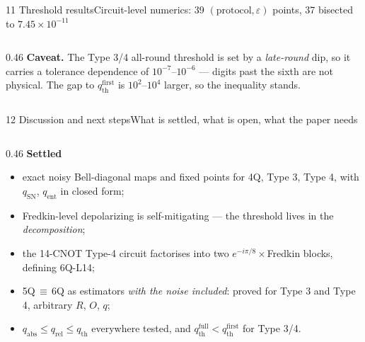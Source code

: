 \documentclass[aspectratio=169,10pt,t]{beamer}
\newcommand{\acc}[1]{{\color{qitaccent}#1}}
\begin{document}
\begin{frame}{11 \quad Threshold results}{Circuit-level numerics: 39 $(\text{protocol},\varepsilon)$ points, 37 bisected to $7.45\times10^{-11}$}
\begin{columns}[T,onlytextwidth]
\begin{column}{0.46\textwidth}
    {\color{qitink2}\textbf{Caveat.} The Type 3/4 all-round threshold is set
    by a \emph{late-round} dip, so it carries a tolerance dependence of
    $10^{-7}$--$10^{-6}$ --- digits past the sixth are not physical. The gap
    to $q_{\mathrm{th}}^{\mathrm{first}}$ is $10^{2}$--$10^{4}$ larger, so
    the inequality stands.}
  \end{column}
  \end{columns}
\end{frame}

\begin{frame}{12 \quad Discussion and next steps}{What is settled, what is open, what the paper needs}
  \vspace{0.8ex}
  \scriptsize
  \begin{columns}[T,onlytextwidth]
  \begin{column}{0.46\textwidth}\vspace{0pt}
    \textbf{Settled}
    \begin{itemize}\itemsep0.25ex
      \item exact noisy Bell-diagonal maps and fixed points for 4Q,
            Type 3, Type 4, with \acc{$q_{\mathrm{SN}}$,
            $q_{\mathrm{ent}}$} in closed form;
      \item Fredkin-level depolarizing is self-mitigating --- the threshold
            lives in the \emph{decomposition};
      \item the 14-CNOT Type-4 circuit factorises into two
            $e^{-i\pi/8}\!\times\!$Fredkin blocks, defining 6Q-L14;
      \item 5Q\,$\equiv$\,6Q as estimators \emph{with the noise included}:
            proved for Type 3 and Type 4, arbitrary $R$, $O$, $q$;
      \item $q_{\mathrm{abs}}\le q_{\mathrm{rel}}\le q_{\mathrm{th}}$
            everywhere tested, and $q_{\mathrm{th}}^{\mathrm{full}}<
            q_{\mathrm{th}}^{\mathrm{first}}$ for Type 3/4.
    \end{itemize}
    \smallskip


\end{column}
\end{columns}
\end{frame}
\end{document}
